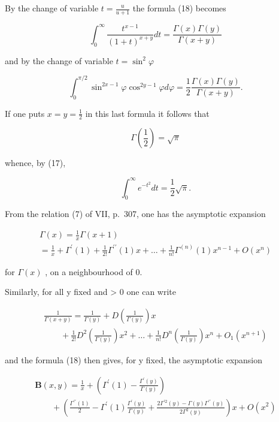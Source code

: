 By the change of variable \(t = \frac{u}{u + 1}\) the formula (18) becomes

\[
\int_ {0} ^ {\infty} \frac {t ^ {x - 1}}{(1 + t) ^ {x + y}} d t = \frac {\Gamma (x) \Gamma (y)}{\Gamma (x + y)}\tag{19}
\]

and by the change of variable \(t = \sin^{2} \varphi\)

\[
\int_ {0} ^ {\pi / 2} \sin^ {2 x - 1} \varphi \cos^ {2 y - 1} \varphi d \varphi = \frac {1}{2} \frac {\Gamma (x) \Gamma (y)}{\Gamma (x + y)}.\tag{20}
\]

If one puts \(x = y = \frac{1}{2}\) in this last formula it follows that

\[
\Gamma (\frac {1}{2}) = \sqrt {\pi}\tag{21}
\]

whence, by (17),

\[
\int_ {0} ^ {\infty} e ^ {- t ^ {2}} d t = \frac {1}{2} \sqrt {\pi}.\tag{22}
\]

From the relation (7) of VII, p.~307, one has the asymptotic expansion

\[
\begin{array}{l} \Gamma (x) = \frac {1}{x} \Gamma (x + 1) \\ = \frac {1}{x} + \Gamma^ {\prime} (1) + \frac {1}{2 !} \Gamma^ {\prime \prime} (1) x + \dots + \frac {1}{n !} \Gamma^ {(n)} (1) x ^ {n - 1} + O (x ^ {n}) \end{array}\tag{23}
\]

for \(\Gamma(x)\) , on a neighbourhood of 0.

Similarly, for all y fixed and \textgreater{} 0 one can write

\[
\begin{array}{l} \frac {1}{\Gamma (x + y)} = \frac {1}{\Gamma (y)} + D \left(\frac {1}{\Gamma (y)}\right) x \\ \qquad + \frac {1}{2 !} D ^ {2} \left(\frac {1}{\Gamma (y)}\right) x ^ {2} + \dots + \frac {1}{n !} D ^ {n} \left(\frac {1}{\Gamma (y)}\right) x ^ {n} + O _ {1} (x ^ {n + 1}) \end{array}
\]

and the formula (18) then gives, for y fixed, the asymptotic expansion

\[
\begin{array}{l} \mathbf {B} (x, y) = \frac {1}{x} + \left(\Gamma^ {\prime} (1) - \frac {\Gamma^ {\prime} (y)}{\Gamma (y)}\right) \\ \qquad + \left(\frac {\Gamma^ {\prime \prime} (1)}{2} - \Gamma^ {\prime} (1) \frac {\Gamma^ {\prime} (y)}{\Gamma (y)} + \frac {2 \Gamma^ {\prime 2} (y) - \Gamma (y) \Gamma^ {\prime \prime} (y)}{2 \Gamma^ {2} (y)}\right) x + O (x ^ {2}) \end{array}\tag{24}
\]

